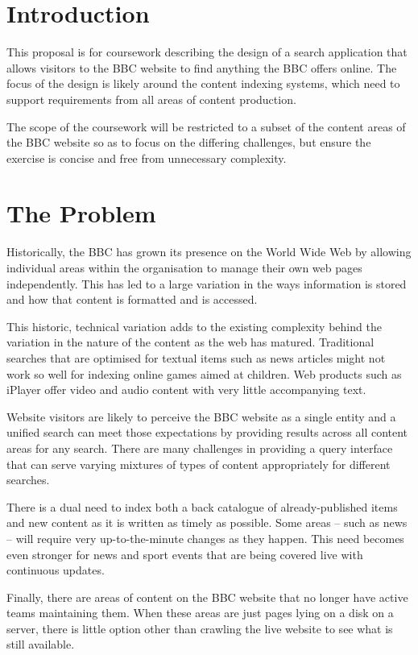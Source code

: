 \section{Introduction}

This proposal is for coursework describing the design of a search application
that allows visitors to the BBC website to find anything the BBC offers
online. The focus of the design is likely around the content indexing
systems, which need to support requirements from all areas of content
production.

The scope of the coursework will be restricted to a subset of the content
areas of the BBC website so as to focus on the differing challenges, but
ensure the exercise is concise and free from unnecessary complexity.

\section{The Problem}

Historically, the BBC has grown its presence on the World Wide Web by
allowing individual areas within the organisation to manage their own web
pages independently. This has led to a large variation in the ways
information is stored and how that content is formatted and is accessed.

This historic, technical variation adds to the existing complexity behind
the variation in the nature of the content as the web has matured. Traditional
searches that are optimised for textual items such as news articles might
not work so well for indexing online games aimed at children. Web products
such as iPlayer offer video and audio content with very little accompanying
text.

Website visitors are likely to perceive the BBC website as a single entity
and a unified search can meet those expectations by providing results
across all content areas for any search. There are many
challenges in providing a query interface that can serve varying
mixtures of types of content appropriately for different searches.

There is a dual need to index both a back catalogue of already-published
items and new content as it is written as timely as possible. Some areas
-- such as news -- will require very up-to-the-minute changes as they happen.
This need becomes even stronger for news and sport events that are being
covered live with continuous updates.

Finally, there are areas of content on the BBC website that no longer have
active teams maintaining them. When these areas are just pages lying on
a disk on a server, there is little option other than crawling the live
website to see what is still available.

